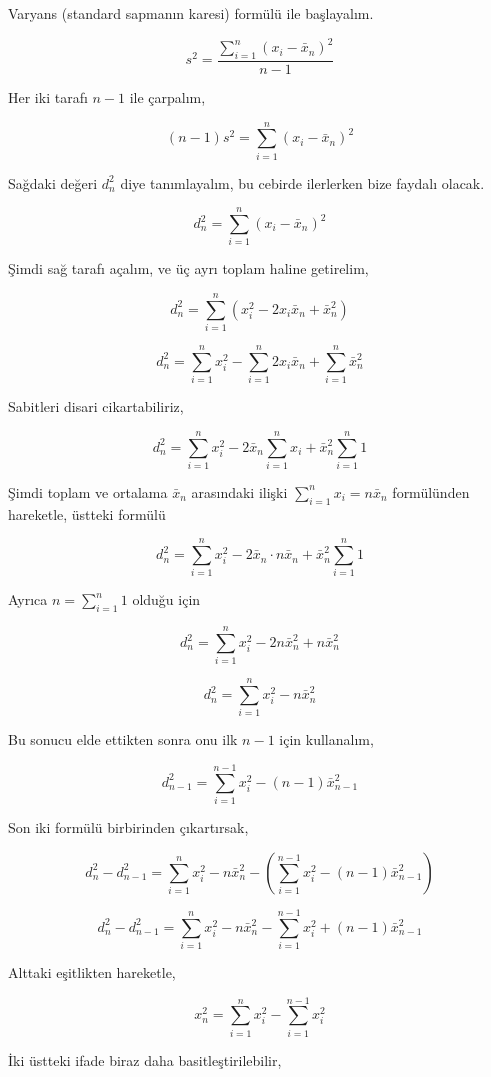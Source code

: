 \documentclass[12pt,fleqn]{article}\usepackage{../../common}
\begin{document}
Varyans (standard sapmanın karesi) formülü ile başlayalım.

$$
s^2 = \frac{ \sum_{i=1}^{n} (x_i - \bar{x}_n )^2 }{n-1}
$$

Her iki tarafı $n-1$ ile çarpalım,

$$
(n-1)s^2 =  \sum_{i=1}^{n} (x_i - \bar{x}_n )^2 
$$

Sağdaki değeri $d_n^2$ diye tanımlayalım, bu cebirde ilerlerken bize
faydalı olacak.

$$
d_n^2 =  \sum_{i=1}^{n} (x_i - \bar{x}_n )^2 
$$

Şimdi sağ tarafı açalım, ve üç ayrı toplam haline getirelim,

$$
d_n^2 = \sum_{i=1}^{n} ( x_i^2 - 2x_i\bar{x}_n + \bar{x}_n^2)
$$

$$
d_n^2 =
\sum_{i=1}^{n} x_i^2 -
\sum_{i=1}^{n} 2x_i\bar{x}_n +
\sum_{i=1}^{n} \bar{x}_n^2
$$

Sabitleri disari cikartabiliriz,

$$
d_n^2 =
\sum_{i=1}^{n} x_i^2 -
2 \bar{x}_n \sum_{i=1}^{n} x_i +
\bar{x}_n^2 \sum_{i=1}^{n} 1
$$

Şimdi toplam ve ortalama $\bar{x}_n$ arasındaki ilişki $\sum _{i=1}^{n} x_i = n \bar{x}_n$ 
formülünden hareketle, üstteki formülü

$$
d_n^2 =
\sum_{i=1}^{n} x_i^2 -
2 \bar{x}_n \cdot n \bar{x}_n +
\bar{x}_n^2 \sum_{i=1}^{n} 1
$$

Ayrıca $n = \sum_{i=1}^{n} 1$ olduğu için

$$
d_n^2 = \sum_{i=1}^{n} x_i^2 - 2 n \bar{x}_n^2 + n \bar{x}_n^2
$$

$$
d_n^2 = \sum_{i=1}^{n} x_i^2 - n \bar{x}_n^2 
$$

Bu sonucu elde ettikten sonra onu ilk $n-1$ için kullanalım,

$$
d_{n-1}^2 = \sum_{i=1}^{n-1} x_i^2 - (n-1) \bar{x}_{n-1}^2 
$$

Son iki formülü birbirinden çıkartırsak,

$$
d_n^2 - d_{n-1}^2 =
\sum_{i=1}^{n} x_i^2 - n \bar{x}_n^2  -
\left( \sum_{i=1}^{n-1} x_i^2 - (n-1) \bar{x}_{n-1}^2   \right)
$$

$$
d_n^2 - d_{n-1}^2 =
\sum_{i=1}^{n} x_i^2 - n \bar{x}_n^2  - \sum_{i=1}^{n-1} x_i^2 + (n-1) \bar{x}_{n-1}^2 
$$

Alttaki eşitlikten hareketle,

$$
x_n^2 = \sum_{i=1}^{n} x_i^2 - \sum_{i=1}^{n-1} x_i^2
$$

İki üstteki ifade biraz daha basitleştirilebilir,
\end{document}
